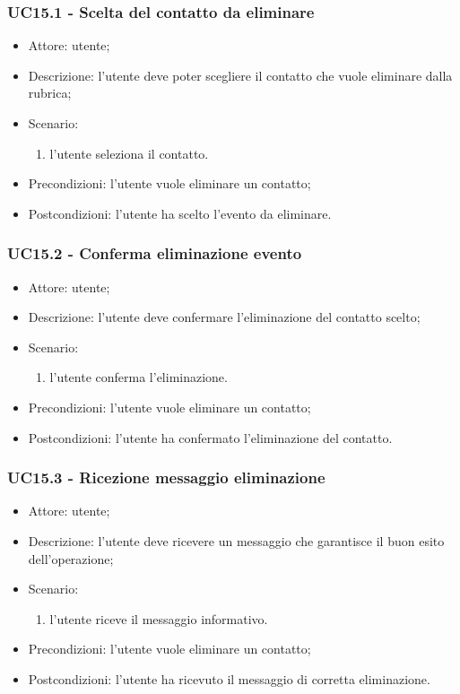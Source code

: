 \subsubsection{UC15.1 - Scelta del contatto da eliminare} \label{sec: UC15.1}
\begin{itemize}
    \item Attore: utente;
    \item Descrizione: l'utente deve poter scegliere il contatto che vuole eliminare dalla rubrica;
    \item Scenario:
        \begin{enumerate}
        \item l'utente seleziona il contatto.
        \end{enumerate}
    
    \item Precondizioni: l'utente vuole eliminare un contatto;
    \item Postcondizioni: l'utente ha scelto l'evento da eliminare.
\end{itemize}


\subsubsection{UC15.2 - Conferma eliminazione evento} \label{sec: UC15.2}
\begin{itemize}
    \item Attore: utente;
    \item Descrizione: l'utente deve confermare l'eliminazione del contatto scelto;
    \item Scenario:
        \begin{enumerate}
        \item l'utente conferma l'eliminazione.
        \end{enumerate}
    
    \item Precondizioni: l'utente vuole eliminare un contatto;
    \item Postcondizioni: l'utente ha confermato l'eliminazione del contatto.
\end{itemize}


\subsubsection{UC15.3 - Ricezione messaggio eliminazione} \label{sec: UC15.3}
\begin{itemize}
    \item Attore: utente;
    \item Descrizione: l'utente deve ricevere un messaggio che garantisce il buon esito dell'operazione;
    \item Scenario:
        \begin{enumerate}
        \item l'utente riceve il messaggio informativo.
        \end{enumerate}
    
    \item Precondizioni: l'utente vuole eliminare un contatto;
    \item Postcondizioni: l'utente ha ricevuto il messaggio di corretta eliminazione.
\end{itemize}